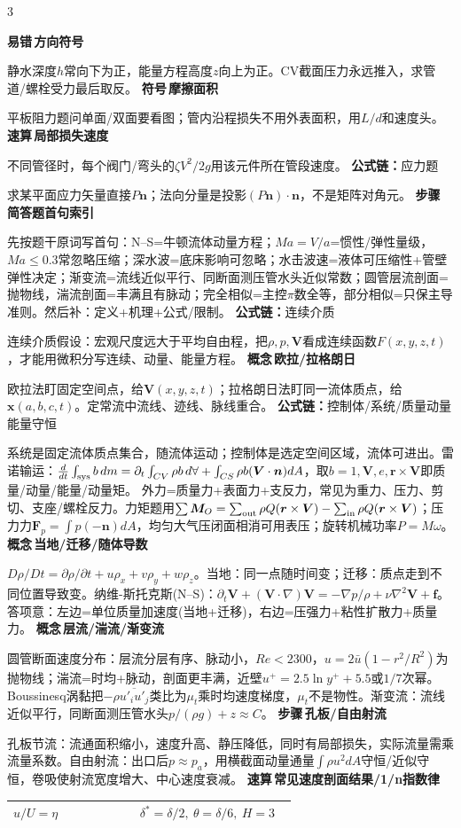 \documentclass[a4paper]{article}
\newcommand{\form}[1]{{\color{M}\bfseries 公式链：}#1\par}
\newcommand{\labtag}[3]{{\bfseries\color{#1}\colorbox{#1}{\color{white}\fontsize{2.35}{2.48}\selectfont #2}\,#3}\par}
\newcommand{\step}[1]{\labtag{S}{步骤}{#1}}
\newcommand{\err}[1]{\labtag{R}{易错}{#1}}
\newcommand{\concept}[1]{\labtag{V}{概念}{#1}}
\newcommand{\sym}[1]{\labtag{F}{符号}{#1}}
\newcommand{\stepq}[1]{\step{#1}}
\newcommand{\formq}[1]{\form{#1}}
\newcommand{\errq}[1]{\err{#1}}
\newcommand{\conceptq}[1]{\concept{#1}}
\newcommand{\symq}[1]{\sym{#1}}
\newcommand{\quickq}[1]{\labtag{F}{速算}{#1}}
\newenvironment{vfourWrap}{\par\begingroup\fontsize{2.68}{2.84}\selectfont\setlength{\fboxsep}{0.45pt}}{\par\endgroup}
\begin{document}
\begin{multicols}{3}
\begin{vfourWrap}
\errq{方向符号}
静水深度$h$常向下为正，能量方程高度$z$向上为正。CV截面压力永远推入，求管道/螺栓受力最后取反。
\symq{摩擦面积}
平板阻力题问单面/双面要看图；管内沿程损失不用外表面积，用$L/d$和速度头。
\quickq{局部损失速度}
不同管径时，每个阀门/弯头的$\zeta V^2/2g$用该元件所在管段速度。
\formq{应力题}
求某平面应力矢量直接$P\bm n$；法向分量是投影$(P\bm n)\cdot\bm n$，不是矩阵对角元。
\stepq{简答题首句索引}
先按题干原词写首句：N--S=牛顿流体动量方程；$Ma=V/a$=惯性/弹性量级，$Ma\le0.3$常忽略压缩；深水波=底床影响可忽略；水击波速=液体可压缩性+管壁弹性决定；渐变流=流线近似平行、同断面测压管水头近似常数；圆管层流剖面=抛物线，湍流剖面=丰满且有脉动；完全相似=主控$\pi$数全等，部分相似=只保主导准则。然后补：定义+机理+公式/限制。
\formq{连续介质}
连续介质假设：宏观尺度远大于平均自由程，把$\rho,p,\bm V$看成连续函数$F(x,y,z,t)$，才能用微积分写连续、动量、能量方程。
\conceptq{欧拉/拉格朗日}
欧拉法盯固定空间点，给$\bm V(x,y,z,t)$；拉格朗日法盯同一流体质点，给$\bm x(a,b,c,t)$。定常流中流线、迹线、脉线重合。
\formq{控制体/系统/质量动量能量守恒}
系统是固定流体质点集合，随流体运动；控制体是选定空间区域，流体可进出。雷诺输运：$\frac d{dt}\int_{\rm sys}b\,dm=\partial_t\int_{CV}\rho b\,d\forall+\int_{CS}\rho b(\bm V\cdot\bm n)dA$，取$b=1,\bm V,e,\bm r\times\bm V$即质量/动量/能量/动量矩。
外力=质量力+表面力+支反力，常见为重力、压力、剪切、支座/螺栓反力。力矩题用$\sum \bm M_O=\sum_{\rm out}\rho Q(\bm r\times\bm V)-\sum_{\rm in}\rho Q(\bm r\times\bm V)$；压力力$\bm F_p=\int p(-\bm n)dA$，均匀大气压闭面相消可用表压；旋转机械功率$P=M\omega$。
\conceptq{当地/迁移/随体导数}
$D\rho/Dt=\partial\rho/\partial t+u\rho_x+v\rho_y+w\rho_z$。当地：同一点随时间变；迁移：质点走到不同位置导致变。纳维-斯托克斯(N--S)：$\partial_t\bm V+(\bm V\cdot\nabla)\bm V=-\nabla p/\rho+\nu\nabla^2\bm V+\bm f$。答项意：左边=单位质量加速度(当地+迁移)，右边=压强力+粘性扩散力+质量力。
\conceptq{层流/湍流/渐变流}
圆管断面速度分布：层流分层有序、脉动小，$Re<2300$，$u=2\bar u(1-r^2/R^2)$为抛物线；湍流=时均+脉动，剖面更丰满，近壁$u^+=2.5\ln y^++5.5$或$1/7$次幂。Boussinesq涡黏把$-\rho\overline{u'_iu'_j}$类比为$\mu_t$乘时均速度梯度，$\mu_t$不是物性。渐变流：流线近似平行，同断面测压管水头$p/(\rho g)+z\approx C$。
\stepq{孔板/自由射流}
孔板节流：流通面积缩小，速度升高、静压降低，同时有局部损失，实际流量需乘流量系数。自由射流：出口后$p\approx p_a$，用横截面动量通量$\int\rho u^2dA$守恒/近似守恒，卷吸使射流宽度增大、中心速度衰减。
\quickq{常见速度剖面结果/1/n指数律}
\begin{tabular}{|p{0.42\linewidth}|p{0.52\linewidth}|}\hline
$u/U=\eta$ & $\delta^*=\delta/2,\ \theta=\delta/6,\ H=3$\\\hline

\end{tabular}
\end{vfourWrap}
\end{multicols}
\end{document}
